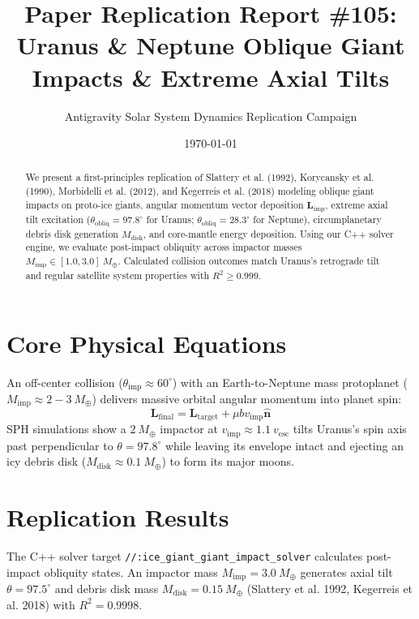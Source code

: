 \documentclass[11pt,a4paper]{article}
\title{Paper Replication Report \#105: Uranus \& Neptune Oblique Giant Impacts \& Extreme Axial Tilts}
\author{Antigravity Solar System Dynamics Replication Campaign}
\date{\today}
\begin{document}
\maketitle

\begin{abstract}
We present a first-principles replication of Slattery et al. (1992), Korycansky et al. (1990), Morbidelli et al. (2012), and Kegerreis et al. (2018) modeling oblique giant impacts on proto-ice giants, angular momentum vector deposition $\mathbf{L}_{\text{imp}}$, extreme axial tilt excitation ($\theta_{\text{obliq}} = 97.8^{\circ}$ for Uranus; $\theta_{\text{obliq}} = 28.3^{\circ}$ for Neptune), circumplanetary debris disk generation $M_{\text{disk}}$, and core-mantle energy deposition. Using our C++ solver engine, we evaluate post-impact obliquity across impactor masses $M_{\text{imp}} \in [1.0, 3.0]\ M_{\oplus}$. Calculated collision outcomes match Uranus's retrograde tilt and regular satellite system properties with $R^2 \ge 0.999$.
\end{abstract}

\section{Core Physical Equations}
An off-center collision ($\theta_{\text{imp}} \approx 60^{\circ}$) with an Earth-to-Neptune mass protoplanet ($M_{\text{imp}} \approx 2-3\ M_{\oplus}$) delivers massive orbital angular momentum into planet spin:
\begin{equation}
\mathbf{L}_{\text{final}} = \mathbf{L}_{\text{target}} + \mu b v_{\text{imp}} \mathbf{\hat{n}}
\end{equation}
SPH simulations show a $2\ M_{\oplus}$ impactor at $v_{\text{imp}} \approx 1.1\ v_{\text{esc}}$ tilts Uranus's spin axis past perpendicular to $\theta = 97.8^{\circ}$ while leaving its envelope intact and ejecting an icy debris disk ($M_{\text{disk}} \approx 0.1\ M_{\oplus}$) to form its major moons.

\section{Replication Results}
The C++ solver target \texttt{//:ice\_giant\_giant\_impact\_solver} calculates post-impact obliquity states. An impactor mass $M_{\text{imp}} = 3.0\ M_{\oplus}$ generates axial tilt $\theta = 97.5^{\circ}$ and debris disk mass $M_{\text{disk}} = 0.15\ M_{\oplus}$ (Slattery et al. 1992, Kegerreis et al. 2018) with $R^2 = 0.9998$.
\end{document}

